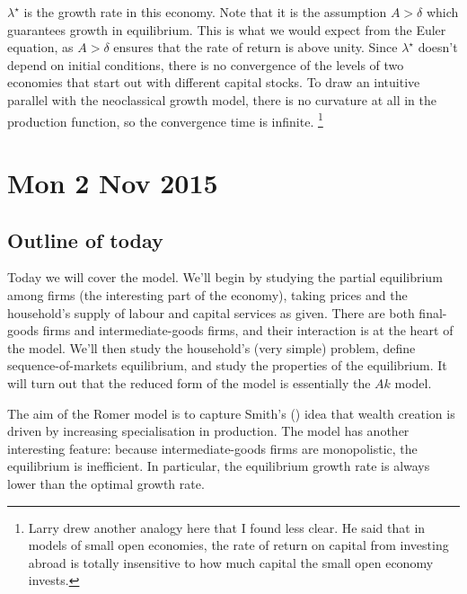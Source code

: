 \documentclass[11pt,letterpaper,reqno,oneside]{article}
\begin{document}
$\lambda^\star$ is the growth rate in this economy. Note that it is the assumption $A > \delta$ which guarantees growth in equilibrium. This is what we would expect from the Euler equation, as $A > \delta$ ensures that the rate of return is above unity. Since $\lambda^\star$ doesn't depend on initial conditions, there is no convergence of the levels of two economies that start out with different capital stocks. To draw an intuitive parallel with the neoclassical growth model, there is no curvature at all in the production function, so the convergence time is infinite.%
	\footnote{Larry drew another analogy here that I found less clear. He said that in models of small open economies, the rate of return on capital from investing abroad is totally insensitive to how much capital the small open economy invests.}



\pagebreak
\section{Mon 2 Nov 2015}
\label{sec:02Nov2015}


\subsection{Outline of today}
\label{sec:02Nov2015:outline_of_today}

Today we will cover the \textcite{Romer1987} model. We'll begin by studying the partial equilibrium among firms (the interesting part of the economy), taking prices and the household's supply of labour and capital services as given. There are both final-goods firms and intermediate-goods firms, and their interaction is at the heart of the model. We'll then study the household's (very simple) problem, define sequence-of-markets equilibrium, and study the properties of the equilibrium. It will turn out that the reduced form of the model is essentially the $Ak$ model.

The aim of the Romer model is to capture Smith's (\citeyear{Smith1776}) idea that wealth creation is driven by increasing specialisation in production. The model has another interesting feature: because intermediate-goods firms are monopolistic, the equilibrium is inefficient. In particular, the equilibrium growth rate is always lower than the optimal growth rate.
\end{document}
